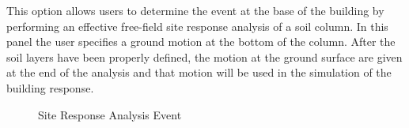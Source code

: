 This option allows users to determine the event at the base of the 
building by performing an effective free-field site response 
analysis of a soil column. In this panel the user specifies a ground 
motion at the bottom of the column. After the soil layers have been properly 
defined, the motion at the ground surface are given at the end 
of the analysis and that motion will be used in the 
simulation of the building response. 

\begin{figure}[!htbp]
  \caption{Site Response Analysis Event}
  \label{fig:s3hark1}
\end{figure}

